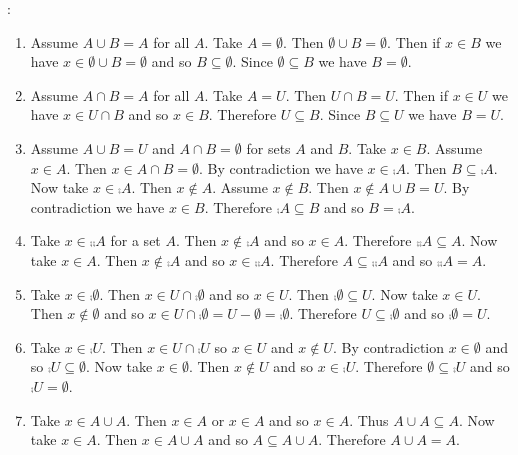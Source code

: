 \documentclass[12pt]{book}
\begin{document}
:
\begin{enumerate}
\renewcommand{\labelenumi}{\arabic{enumi}.}
\setcounter{enumi}{5}
\item Assume $A \cup B = A$ for all $A$. Take $A = \emptyset$. Then $\emptyset \cup B = \emptyset$. Then if $x \in B$ we have $x \in \emptyset \cup B = \emptyset$ and so $B \subseteq \emptyset$. Since $\emptyset \subseteq B$ we have $B = \emptyset$.
\renewcommand{\labelenumi}{\arabic{enumi}'.}
\setcounter{enumi}{5}
\item Assume $A \cap B = A$ for all $A$. Take $A = U$. Then $U \cap B = U$. Then if $x \in U$ we have $x \in U \cap B$ and so $x \in B$. Therefore $U \subseteq B$. Since $B \subseteq U$ we have $B = U$.
\renewcommand{\labelenumi}{\arabic{enumi},\arabic{enumi}'.}
\setcounter{enumi}{6}
\item Assume $A \cup  B = U$ and $A \cap B = \emptyset$ for sets $A$ and $B$. Take $x \in B$. Assume $x \in A$. Then $x \in A \cap B = \emptyset$. By contradiction we have $x \in \comp{A}$. Then $B \subseteq \comp{A}$. Now take $x \in \comp{A}$. Then $x \notin A$. Assume $x \notin B$. Then $x \notin A \cup B = U$. By contradiction we have $x \in B$. Therefore $\comp{A} \subseteq B$ and so $B = \comp{A}$.
\item Take $x \in \comp{\comp{A}}$ for a set $A$. Then $x \notin \comp{A}$ and so $x \in A$. Therefore $\comp{\comp{A}} \subseteq A$. Now take $x \in A$. Then $x \notin \comp{A}$ and so $x \in \comp{\comp{A}}$. Therefore $A \subseteq \comp{\comp{A}}$ and so $\comp{\comp{A}} = A$.
\renewcommand{\labelenumi}{\arabic{enumi}.}
\setcounter{enumi}{8}
\item Take $x \in \comp{\emptyset}$. Then $x \in U \cap \comp{\emptyset}$ and so $x \in U$. Then $\comp{\emptyset} \subseteq U$. Now take $x \in U$. Then $x \notin \emptyset$ and so $x \in U \cap \comp{\emptyset} = U - \emptyset = \comp{\emptyset}$. Therefore $U \subseteq \comp{\emptyset}$ and so $\comp{\emptyset} = U$.
\renewcommand{\labelenumi}{\arabic{enumi}'.}
\setcounter{enumi}{8}
\item Take $x \in \comp{U}$. Then $x \in U \cap \comp{U}$ so $x \in U$ and $x \notin U$. By contradiction $x \in \emptyset$ and so $\comp{U} \subseteq \emptyset$. Now take $x \in \emptyset$. Then $x \notin U$ and so $x \in \comp{U}$. Therefore $\emptyset \subseteq \comp{U}$ and so $\comp{U} = \emptyset$.
\renewcommand{\labelenumi}{\arabic{enumi}.}
\setcounter{enumi}{9}
\item Take $x \in A \cup A$. Then $x \in A$ or $x \in A$ and so $x \in A$. Thus $A \cup A \subseteq A$. Now take $x \in A$. Then $x \in A \cup A$ and so $A \subseteq A \cup A$. Therefore $A \cup A = A$.

\end{enumerate}
\end{document}
